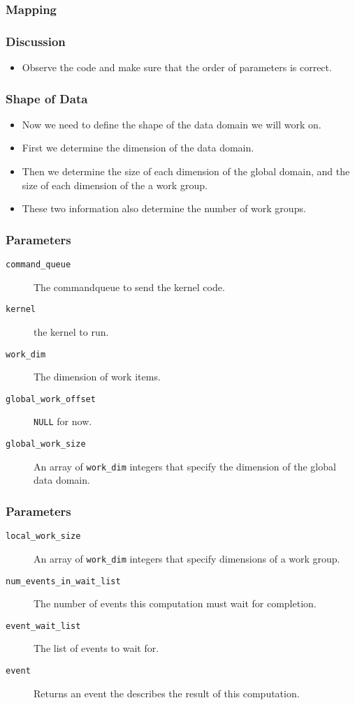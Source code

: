 \documentclass{beamer}
\begin{document}
\begin{frame}
  \frametitle{Mapping}
\end{frame}

\begin{frame}
  \frametitle{Discussion}
  \begin{itemize}
    \item Observe the code and make sure that the order of parameters
      is correct.
  \end{itemize}
\end{frame}

\begin{frame}
  \frametitle{Shape of Data}
  \begin{itemize}
  \item Now we need to define the shape of the data domain we will
    work on.
  \item First we determine the dimension of the data domain.
  \item Then we determine the size of each dimension of the global
    domain, and the size of each dimension of the a work group.
  \item These two information also determine the number of work groups.
  \end{itemize}
\end{frame}

\begin{frame}
\end{frame}

\begin{frame}
  \frametitle{Parameters}
  \begin{description}
  \item [\tt command\_queue] The commandqueue to send the kernel code.
  \item [\tt kernel] the kernel to run.
  \item [\tt work\_dim] The dimension of work items.
  \item [\tt global\_work\_offset] {\tt NULL} for now.
  \item [\tt global\_work\_size] An array of {\tt work\_dim} integers
    that specify the dimension of the global data domain.
  \end{description}
\end{frame}

\begin{frame}
  \frametitle{Parameters}
  \begin{description}
  \item [\tt local\_work\_size] An array of {\tt work\_dim} integers
    that specify dimensions of a work group.
  \item [\tt num\_events\_in\_wait\_list] The number of events this
    computation must wait for completion.
  \item [\tt event\_wait\_list] The list of events to wait for.
  \item [\tt event] Returns an event the describes the result of this
    computation.
  \end{description}
\end{frame}
\end{document}
